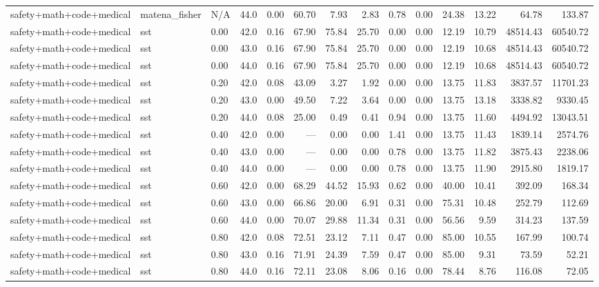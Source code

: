 \documentclass{article}
\begin{document}
\begin{table}[H]
{\begin{tabular}{llllrrrrrrrrrr}
safety+math+code+medical & matena\_fisher & N/A & 44.0 & 0.00 & 60.70 & 7.93 & 2.83 & 0.78 & 0.00 & 24.38 & 13.22 & 64.78 & 133.87 \\
safety+math+code+medical & sst & 0.00 & 42.0 & 0.16 & 67.90 & 75.84 & 25.70 & 0.00 & 0.00 & 12.19 & 10.79 & 48514.43 & 60540.72 \\
safety+math+code+medical & sst & 0.00 & 43.0 & 0.16 & 67.90 & 75.84 & 25.70 & 0.00 & 0.00 & 12.19 & 10.68 & 48514.43 & 60540.72 \\
safety+math+code+medical & sst & 0.00 & 44.0 & 0.16 & 67.90 & 75.84 & 25.70 & 0.00 & 0.00 & 12.19 & 10.68 & 48514.43 & 60540.72 \\
safety+math+code+medical & sst & 0.20 & 42.0 & 0.08 & 43.09 & 3.27 & 1.92 & 0.00 & 0.00 & 13.75 & 11.83 & 3837.57 & 11701.23 \\
safety+math+code+medical & sst & 0.20 & 43.0 & 0.00 & 49.50 & 7.22 & 3.64 & 0.00 & 0.00 & 13.75 & 13.18 & 3338.82 & 9330.45 \\
safety+math+code+medical & sst & 0.20 & 44.0 & 0.08 & 25.00 & 0.49 & 0.41 & 0.94 & 0.00 & 13.75 & 11.60 & 4494.92 & 13043.51 \\
safety+math+code+medical & sst & 0.40 & 42.0 & 0.00 & --- & 0.00 & 0.00 & 1.41 & 0.00 & 13.75 & 11.43 & 1839.14 & 2574.76 \\
safety+math+code+medical & sst & 0.40 & 43.0 & 0.00 & --- & 0.00 & 0.00 & 0.78 & 0.00 & 13.75 & 11.82 & 3875.43 & 2238.06 \\
safety+math+code+medical & sst & 0.40 & 44.0 & 0.00 & --- & 0.00 & 0.00 & 0.78 & 0.00 & 13.75 & 11.90 & 2915.80 & 1819.17 \\
safety+math+code+medical & sst & 0.60 & 42.0 & 0.00 & 68.29 & 44.52 & 15.93 & 0.62 & 0.00 & 40.00 & 10.41 & 392.09 & 168.34 \\
safety+math+code+medical & sst & 0.60 & 43.0 & 0.00 & 66.86 & 20.00 & 6.91 & 0.31 & 0.00 & 75.31 & 10.48 & 252.79 & 112.69 \\
safety+math+code+medical & sst & 0.60 & 44.0 & 0.00 & 70.07 & 29.88 & 11.34 & 0.31 & 0.00 & 56.56 & 9.59 & 314.23 & 137.59 \\
safety+math+code+medical & sst & 0.80 & 42.0 & 0.08 & 72.51 & 23.12 & 7.11 & 0.47 & 0.00 & 85.00 & 10.55 & 167.99 & 100.74 \\
safety+math+code+medical & sst & 0.80 & 43.0 & 0.16 & 71.91 & 24.39 & 7.59 & 0.47 & 0.00 & 85.00 & 9.31 & 73.59 & 52.21 \\
safety+math+code+medical & sst & 0.80 & 44.0 & 0.16 & 72.11 & 23.08 & 8.06 & 0.16 & 0.00 & 78.44 & 8.76 & 116.08 & 72.05 \\

\end{tabular}}
\end{table}
\end{document}
